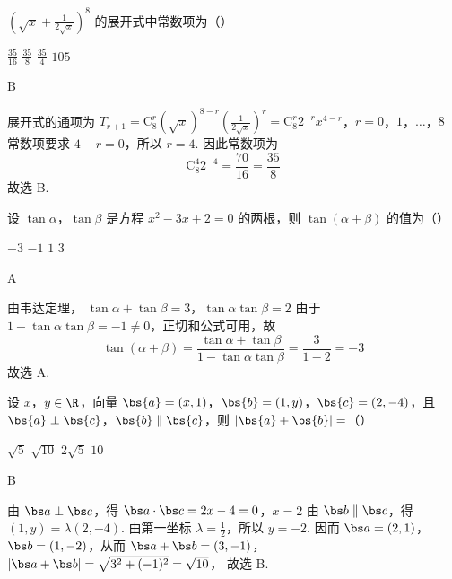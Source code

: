 \begin{problem}
\(\left(\sqrt{x} +\frac{1}{2\sqrt{x}}\right)^8\) 的展开式中常数项为（\quad）

\choices
    {\(\frac{35}{16}\)}
    {\(\frac{35}{8}\)}
    {\(\frac{35}{4}\)}
    {\(105\)}

\begin{answer}
B
\end{answer}

\begin{solution}
展开式的通项为
\(T_{r+1}=\mathrm C_{8}^{r}(\sqrt{x})^{8-r}\left(\frac{1}{2\sqrt{x}}\right)^{r} =\mathrm C_{8}^{r}2^{-r}x^{4-r}\)，\(r=0\)，\(1\)，\(\ldots\)，\(8\)
常数项要求 \(4-r=0\)，所以 \(r=4\). 因此常数项为
\[
\mathrm C_{8}^{4}2^{-4}=\frac{70}{16}=\frac{35}{8}
\]
故选 B.
\end{solution}
\end{problem}

\begin{problem}
设 \(\tan \alpha\)，\(\tan \beta\) 是方程 \(x^{2} - 3x + 2 = 0\) 的两根，则 \(\tan (\alpha + \beta)\) 的值为（\quad）

\choices
    {\(-3\)}
    {\(-1\)}
    {\(1\)}
    {\(3\)}

\begin{answer}
A
\end{answer}

\begin{solution}
由韦达定理，
\(\tan\alpha+\tan\beta=3\)，\(\tan\alpha\tan\beta=2\)
由于 \(1-\tan\alpha\tan\beta=-1\ne0\)，正切和公式可用，故
\[
\tan(\alpha+\beta)
=\frac{\tan\alpha+\tan\beta}{1-\tan\alpha\tan\beta}
=\frac{3}{1-2}=-3
\]
故选 A.
\end{solution}
\end{problem}

\begin{problem}
设 \(x\)，\(y \in \R\)，向量 \(\bs{a} = (x, 1)\)，\(\bs{b} = (1, y)\)，\(\bs{c} = (2, -4)\)，且 \(\bs{a} \perp \bs{c}\)，\(\bs{b} \parallel \bs{c}\)，则 \(|\bs{a} + \bs{b}| =\)（\quad）

\choices
    {\(\sqrt{5}\)}
    {\(\sqrt{10}\)}
    {\(2\sqrt{5}\)}
    {\(10\)}

\begin{answer}
B
\end{answer}

\begin{solution}
由 \(\bs a\perp\bs c\)，得
\(\bs a\cdot\bs c=2x-4=0\)，\(x=2\)
由 \(\bs b\parallel\bs c\)，得 \((1,y)=\lambda(2,-4)\). 由第一坐标 \(\lambda=\frac12\)，所以 \(y=-2\). 因而 \(\bs a=(2,1)\)，\(\bs b=(1,-2)\)，从而
\(\bs a+\bs b=(3,-1)\)，\(|\bs a+\bs b|=\sqrt{3^{2}+(-1)^{2}}=\sqrt{10}\)，
故选 B.
\end{solution}
\end{problem}

